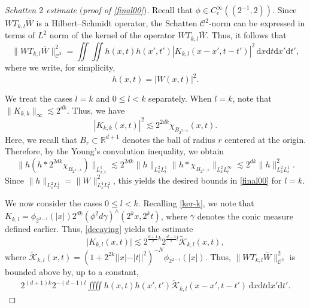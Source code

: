 \documentclass[a4paper]{amsart}
\numberwithin{figure}{section}
\numberwithin{equation}{section}%
\theoremstyle{plain}%
\theoremstyle{definition}
\theoremstyle{remark}%
\def\d{\mathrm{d}}
\def\C{\mathcal{C}}
\begin{document}
\begin{proof}[Schatten $2$ estimate $($proof of \eqref{final00}$)$]
Recall that $\phi\in C^\infty_c((2^{-1}, 2))$. 
Since $WT_{k,l}\overline W$ is a Hilbert--Schmidt operator, the Schatten $\mathcal C^2$-norm can be expressed in terms of $L^2$ norm of the kernel of the operator $WT_{k,l}\overline W$. Thus, it follows that 
\begin{equation}
\label{e:c2}
    \|WT_{k,l}\overline{W}\|_{\C^2}^2
    =
    \iint \iint h(x,t) h(x',t') |K_{k,l}(x-x',t-t')|^2\,\d x \d t \d x' \d t', 
\end{equation}
where we write, for simplicity, 
\[h(x,t)=|W(x,t)|^2.\]


We treat the cases $l=k$ and $0\le l<k$ separately. When $l=k$, note that $\|K_{k,k}\|_\infty\lesssim 2^{dk}.$  Thus, we have 
\[|K_{k,k}(x,t) |^2 \lesssim 2^{2dk}\chi_{B_{2^{3-k}}}(x,t).\]
Here, we recall that $B_r\subset \mathbb R^{d+1}$ denotes the ball of radius $r$ centered at the origin. Therefore, by the Young's convolution inequality, we obtain
\[
\|h (h \ast 2^{2dk} \chi_{B_{2^{3-k}}})\|_{L_{x,t}^1}
\lesssim  2^{2dk} \|h\|_{L_x^2L_t^1} \|h\ast \chi_{B_{2^{3-k}}}\|_{L_x^2L_t^\infty}
\lesssim 2^{dk}\|h\|_{L_x^2L_t^1}^2.
\]
Since $\|h\|_{L_x^2L_t^1}=\|W\|_{L_x^4L_t^2}^2$, this yields the desired bounds in \eqref{final00} for $l=k$.

 
We now consider the cases  $0\le l<k$.   
Recalling \eqref{ker-k}, we note that $K_{k,l}=\phi_{2^{2-l}}(|x|) 2^{dk}(\phi^2 d\gamma)^\wedge(2^kx,2^kt)$, where $\gamma$ denotes the conic measure defined earlier. Thus,  \eqref{decaying} yields the  estimate
\[
\big| K_{k,l}(x,t) \big| \lesssim 2^{\frac{d+1}2 k} 2^{\frac{d-1}{2} l}  \widetilde{\mathcal K}_{k,l} (x,t), 
\]  
where $\widetilde{\mathcal K}_{k,l} (x,t)=(1+2^{2k}||x|-|t||^2)^{-N}\phi_{2^{2-l}}(|x|)$.
Thus,  $\|WT_{k,l}\overline{W}\|_{\C^2}^2$ is bounded above by, up to a constant,
\begin{align}\label{cfcf}
2^{(d+1)k} 2^{-(d-1) l}   \iiiint h(x,t) h(x',t')   \widetilde{\mathcal K}_{k,l}(x-x',t-t')\,\d x \d t \d x' \d t'.
\end{align}


\end{proof}
\end{document}
